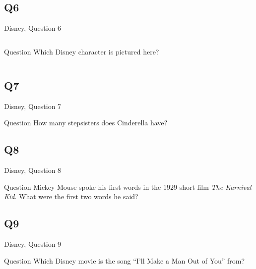 \documentclass[11pt]{beamer}
\begin{document}
\subsection*{Q6}
\begin{frame}[t]{Disney, Question 6}
\begin{columns}[T,totalwidth=\linewidth]
\begin{column}{0.32\linewidth}
\begin{block}{Question}
Which Disney character is pictured here?
\end{block}
\end{column}
\begin{column}{0.65\linewidth}
\begin{center}
\texttt{[image: \{Images/geppetto]}.jpg}
\end{center}
\end{column}
\end{columns}
\end{frame}
\subsection*{Q7}
\begin{frame}[t]{Disney, Question 7}
\begin{block}{Question}
How many stepsisters does Cinderella have?
\end{block}
\end{frame}
\subsection*{Q8}
\begin{frame}[t]{Disney, Question 8}
\begin{block}{Question}
Mickey Mouse spoke his first words in the 1929 short film \emph{The Karnival Kid}. What were the first two words he said?
\end{block}
\end{frame}
\subsection*{Q9}
\begin{frame}[t]{Disney, Question 9}
\begin{block}{Question}
Which Disney movie is the song ``I'll Make a Man Out of You'' from?
\end{block}
\end{frame}
\end{document}
